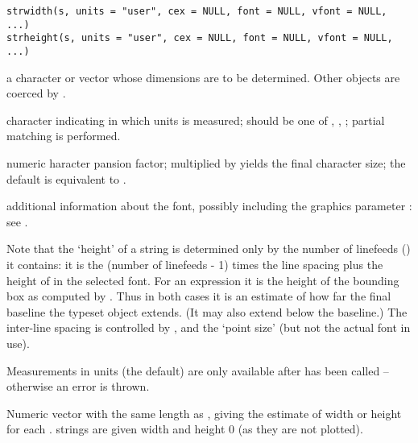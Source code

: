 %
\begin{Usage}
\begin{verbatim}
strwidth(s, units = "user", cex = NULL, font = NULL, vfont = NULL, ...)
strheight(s, units = "user", cex = NULL, font = NULL, vfont = NULL, ...)
\end{verbatim}
\end{Usage}
%
\begin{Arguments}
\begin{ldescription}
\item[\code{s}] a character or  vector whose dimensions
are to be determined.  Other objects are coerced by
.
\item[\code{units}] character indicating in which units  is measured;
should be one of , , ;
partial matching is performed.
\item[\code{cex}] numeric haracter pansion factor; multiplied
by  yields the final character size; the
default  is equivalent to .
\item[\code{font, vfont, ...}] additional information about the font,
possibly including the graphics parameter :
see .
\end{ldescription}
\end{Arguments}
%
\begin{Details}\relax
Note that the `height' of a string is determined only by the
number of linefeeds () it contains: it is the (number of
linefeeds - 1) times the line spacing plus the height of  in
the selected font.  For an expression it is the height of the
bounding box as computed by .  Thus in both cases it is
an estimate of how far  the final baseline the typeset
object extends.  (It may also extend below the baseline.)  The
inter-line spacing is controlled by ,
 and the `point size' (but not the
actual font in use).

Measurements in  units (the default) are only available
after  has been called -- otherwise an error is
thrown.
\end{Details}
%
\begin{Value}
Numeric vector with the same length as , giving the estimate of
width or height for each .   strings are given
width and height 0 (as they are not plotted).
\end{Value}

